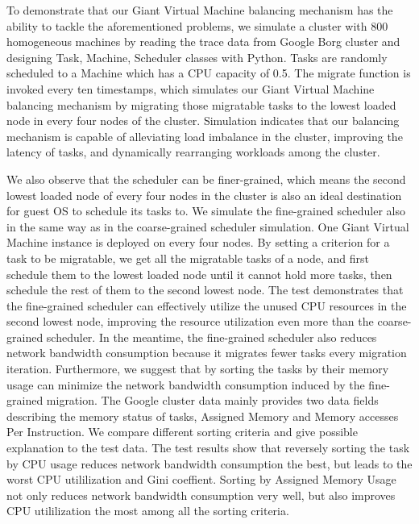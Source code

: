 \begin{bigabstract}
To demonstrate that our Giant Virtual Machine balancing mechanism has the ability to tackle the aforementioned problems, we simulate a cluster with 800 homogeneous machines by reading the trace data from Google Borg cluster and designing Task, Machine, Scheduler classes with Python. Tasks are randomly scheduled to a Machine which has a CPU capacity of 0.5. The migrate function is invoked every ten timestamps, which simulates our Giant Virtual Machine balancing mechanism by migrating those migratable tasks to the lowest loaded node in every four nodes of the cluster. Simulation indicates that our balancing mechanism is capable of alleviating load imbalance in the cluster, improving the latency of tasks, and dynamically rearranging workloads among the cluster. 

We also observe that the scheduler can be finer-grained, which means the second lowest loaded node of every four nodes in the cluster is also an ideal destination for guest OS to schedule its tasks to. We simulate the fine-grained scheduler also in the same way as in the coarse-grained scheduler simulation. One Giant Virtual Machine instance is deployed on every four nodes. By setting a criterion for a task to be migratable, we get all the migratable tasks of a node, and first schedule them to the lowest loaded node until it cannot hold more tasks, then schedule the rest of them to the second lowest node. The test demonstrates that the fine-grained scheduler can effectively utilize the unused CPU resources in the second lowest node, improving the resource utilization even more than the coarse-grained scheduler. In the meantime, the fine-grained scheduler also reduces network bandwidth consumption because it migrates fewer tasks every migration iteration. Furthermore, we suggest that by sorting the tasks by their memory usage can minimize the network bandwidth consumption induced by the fine-grained migration. The Google cluster data mainly provides two data fields describing the memory status of tasks, Assigned Memory and Memory accesses Per Instruction. We compare different sorting criteria and give possible explanation to the test data. The test results show that reversely sorting the task by CPU usage reduces network bandwidth consumption the best, but leads to the worst CPU utililization and Gini coeffient. Sorting by Assigned Memory Usage not only reduces network bandwidth consumption very well, but also improves CPU utililization the most among all the sorting criteria. 


\end{bigabstract}